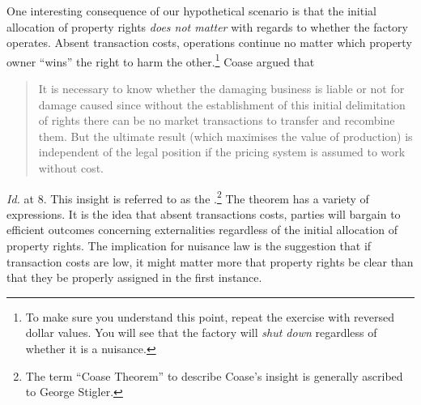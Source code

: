 One interesting consequence of our hypothetical scenario is that the initial
allocation of property rights \textit{does not matter} with regards to whether
the factory operates. Absent transaction costs, operations continue no matter
which property owner ``wins'' the right to harm the other.\footnote{To make sure
you understand this point, repeat the exercise with reversed dollar values. You
will see that the factory will \textit{shut down} regardless of whether it is a
nuisance.} Coase argued that 
\begin{quote}
It is necessary to know whether the damaging business is liable or not for
damage caused since without the establishment of this initial delimitation of
rights there can be no market transactions to transfer and recombine them. But
the ultimate result (which maximises the value of production) is independent of
the legal position if the pricing system is assumed to work without cost.
\end{quote}
\textit{Id.} at 8. This insight is referred to as the .\footnote{The term ``Coase Theorem'' to describe Coase's insight is
generally ascribed to George Stigler.} The theorem has a variety of expressions.
It is the idea that absent transactions costs, parties will bargain to efficient
outcomes concerning externalities regardless of the initial allocation of
property rights. The implication for nuisance law is the suggestion that if
transaction costs are low, it might matter more that property rights be clear
than that they be properly assigned in the first instance.

